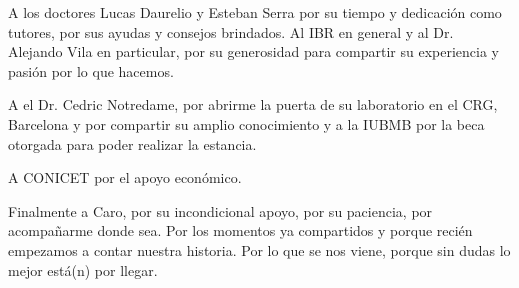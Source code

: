 \begin{acknowledgements}
A los doctores Lucas Daurelio y Esteban Serra por su tiempo y dedicación como tutores, por sus ayudas y consejos brindados.
Al IBR en general y al Dr. Alejando Vila en particular, por su generosidad para compartir su experiencia y pasión por lo que hacemos.

A el Dr. Cedric Notredame, por abrirme la puerta de su laboratorio en el CRG, Barcelona y por compartir su amplio conocimiento y a la IUBMB por la beca otorgada para poder realizar la estancia.

A CONICET por el apoyo económico.

Finalmente a Caro, por su incondicional apoyo, por su paciencia, por acompañarme donde sea.
Por los momentos ya compartidos y porque recién empezamos a contar nuestra historia.
Por lo que se nos viene, porque sin dudas lo mejor está(n) por llegar.

\end{acknowledgements}
